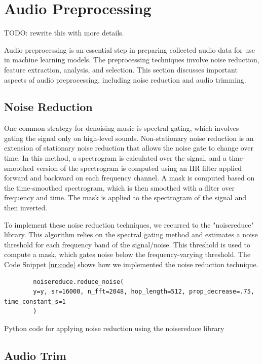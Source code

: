 \section{Audio Preprocessing}
TODO: rewrite this with more details.

Audio preprocessing is an essential step in preparing collected audio data for use in machine learning models. The preprocessing techniques involve noise reduction, feature extraction, analysis, and selection. This section discusses important aspects of audio preprocessing, including noise reduction and audio trimming.

\subsection{Noise Reduction}

One common strategy for denoising music is spectral gating, which involves gating the signal only on high-level sounds. Non-stationary noise reduction is an extension of stationary noise reduction that allows the noise gate to change over time. In this method, a spectrogram is calculated over the signal, and a time-smoothed version of the spectrogram is computed using an IIR filter applied forward and backward on each frequency channel. A mask is computed based on the time-smoothed spectrogram, which is then smoothed with a filter over frequency and time. The mask is applied to the spectrogram of the signal and then inverted.

To implement these noise reduction techniques, we recurred to the "noisereduce" library. This algorithm relies on the spectral gating method and estimates a noise threshold for each frequency band of the signal/noise. This threshold is used to compute a mask, which gates noise below the frequency-varying threshold. The Code Snippet \ref{nr:code} shows how we implemented the noise reduction technique.

\begin{listing}[H]
	\begin{verbatim}
		noisereduce.reduce_noise(
		y=y, sr=16000, n_fft=2048, hop_length=512, prop_decrease=.75, time_constant_s=1
		)
	\end{verbatim}
	\caption{Python code for applying noise reduction using the noisereduce library}
	\label{nr:code}
\end{listing}


\subsection{Audio Trim}

